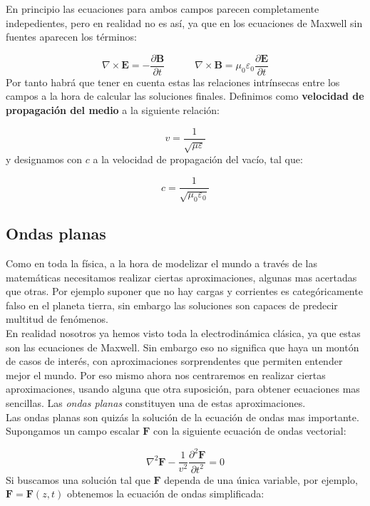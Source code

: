\documentclass[12pt,a4paper]{article}
\newcommand{\parciales}[2]{\frac{\partial #1}{\partial #2}}
\newcommand{\tquad}{\quad \quad \quad}
\newcommand{\rota}{\nabla \times}
\newcommand{\Bn}{\mathbf{B}}
\newcommand{\En}{\mathbf{E}}
\newcommand{\Fn}{\mathbf{F}}
\numberwithin{equation}{section}
\numberwithin{figure}{section}
\begin{document}
En principio las ecuaciones para ambos campos parecen completamente indepedientes, pero en realidad no es así, ya que en los ecuaciones de Maxwell sin fuentes aparecen los términos:

$$ \rota \En = - \parciales{\Bn}{t} \tquad \rota \Bn = \mu_0 \varepsilon_0 \parciales{\En}{t} $$
Por tanto habrá que tener en cuenta estas las relaciones intrínsecas entre los campos a la hora de calcular las soluciones finales. Definimos como \textbf{velocidad de propagación del medio} a la siguiente relación:

\begin{equation}
v = \dfrac{1}{\sqrt{\mu \varepsilon}}
\end{equation}
y designamos con $c$ a la velocidad de propagación del vacío, tal que:

\begin{equation}
c = \dfrac{1}{\sqrt{\mu_0 \varepsilon_0}}
\end{equation}

\subsection{Ondas planas}


Como en toda la física, a la hora de modelizar el mundo a través de las matemáticas necesitamos realizar ciertas aproximaciones, algunas mas acertadas que otras. Por ejemplo suponer que no hay cargas y corrientes es categóricamente falso en el planeta tierra, sin embargo las soluciones son capaces de predecir multitud de fenómenos. \\

En realidad nosotros ya hemos visto toda la electrodinámica clásica, ya que estas son las ecuaciones de Maxwell. Sin embargo eso no significa que haya un montón de casos de interés, con aproximaciones sorprendentes que permiten entender mejor el mundo. Por eso mismo ahora nos centraremos en realizar ciertas aproximaciones, usando alguna que otra suposición, para obtener ecuaciones mas sencillas. Las \textit{ondas planas} constituyen una de estas aproximaciones. \\


Las ondas planas son quizás la solución de la ecuación de ondas mas importante. Supongamos un campo escalar $\Fn$ con la siguiente ecuación de ondas vectorial: 

\begin{equation}
\nabla^2 \Fn - \dfrac{1}{v^2} \dfrac{\partial^2 \Fn}{\partial t^2} = 0  
\end{equation}
Si buscamos una solución tal que $\Fn$ dependa de una única variable, por ejemplo, $\Fn = \Fn(z,t)$ obtenemos la ecuación de ondas simplificada:
\end{document}

